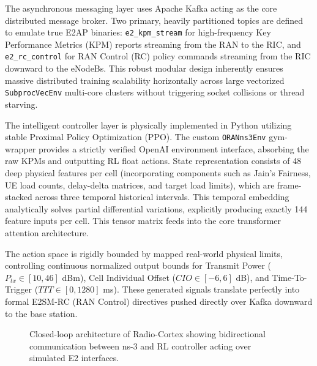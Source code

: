 \documentclass[12pt,a4paper]{article}
\begin{document}
The asynchronous messaging layer uses Apache Kafka acting as the core distributed message broker. Two primary, heavily partitioned topics are defined to emulate true E2AP binaries: \texttt{e2\_kpm\_stream} for high-frequency Key Performance Metrics (KPM) reports streaming from the RAN to the RIC, and \texttt{e2\_rc\_control} for RAN Control (RC) policy commands streaming from the RIC downward to the eNodeBs. This robust modular design inherently ensures massive distributed training scalability horizontally across large vectorized \texttt{SubprocVecEnv} multi-core clusters without triggering socket collisions or thread starving.

The intelligent controller layer is physically implemented in Python utilizing stable Proximal Policy Optimization (PPO). The custom \texttt{ORANns3Env} gym-wrapper provides a strictly verified OpenAI environment interface, absorbing the raw KPMs and outputting RL float actions. State representation consists of 48 deep physical features per cell (incorporating components such as Jain's Fairness, UE load counts, delay-delta matrices, and target load limits), which are frame-stacked across three temporal historical intervals. This temporal embedding analytically solves partial differential variations, explicitly producing exactly 144 feature inputs per cell. This tensor matrix feeds into the core transformer attention architecture.

The action space is rigidly bounded by mapped real-world physical limits, controlling continuous normalized output bounds for Transmit Power ($P_{tx} \in [10, 46]$ dBm), Cell Individual Offset ($CIO \in [-6, 6]$ dB), and Time-To-Trigger ($TTT \in [0, 1280]$ ms). These generated signals translate perfectly into formal E2SM-RC (RAN Control) directives pushed directly over Kafka downward to the base station.

\begin{figure}[H]
\centering
{}
\caption{Closed-loop architecture of Radio-Cortex showing bidirectional communication between ns-3 and RL controller acting over simulated E2 interfaces.}
\label{fig:closed_loop}
\end{figure}
\end{document}
